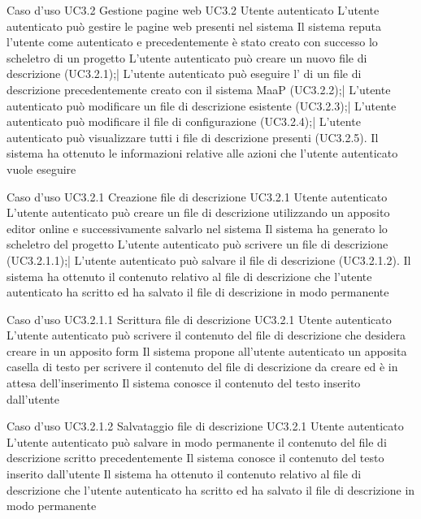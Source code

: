 \UCtitle
{Caso d'uso UC3.2}
{Gestione pagine web}
\UC
{UC3.2}
{Utente autenticato}
{L'utente autenticato può gestire le pagine web presenti nel sistema}
{Il sistema reputa l'utente come autenticato e precedentemente è stato creato con successo lo scheletro di un progetto}
\scenario
{L'utente autenticato può creare un nuovo file di descrizione (UC3.2.1);|
L'utente autenticato può eseguire l' di un file di descrizione precedentemente creato con il sistema MaaP (UC3.2.2);|
L'utente autenticato può modificare un file di descrizione esistente (UC3.2.3);|
L'utente autenticato può modificare il file di configurazione (UC3.2.4);|
L'utente autenticato può visualizzare tutti i file di descrizione presenti (UC3.2.5).
}
\post
{Il sistema ha ottenuto le informazioni relative alle azioni che l'utente autenticato vuole eseguire}


\UCtitle
{Caso d'uso UC3.2.1}
{Creazione file di descrizione}
\UC
{UC3.2.1}
{Utente autenticato}
{L'utente autenticato può creare un file di descrizione utilizzando un apposito editor online e successivamente salvarlo nel sistema}
{Il sistema ha generato lo scheletro del progetto}
\scenario
{L'utente autenticato può scrivere un file di descrizione (UC3.2.1.1);|
L'utente autenticato può salvare il file di descrizione (UC3.2.1.2).
}
\post
{Il sistema ha ottenuto il contenuto relativo al file di descrizione che l'utente autenticato ha scritto ed ha salvato il file di descrizione in modo permanente}

\UCtitle
{Caso d'uso UC3.2.1.1}
{Scrittura file di descrizione}
\UC
{UC3.2.1}
{Utente autenticato}
{L'utente autenticato può scrivere il contenuto del file di descrizione che desidera creare in un apposito form}
{Il sistema propone all'utente autenticato un apposita casella di testo per scrivere il contenuto del file di descrizione da creare ed è in attesa dell'inserimento}
\post
{Il sistema conosce il contenuto del testo inserito dall'utente}

\UCtitle
{Caso d'uso UC3.2.1.2}
{Salvataggio file di descrizione}
\UC
{UC3.2.1}
{Utente autenticato}
{L'utente autenticato può salvare in modo permanente il contenuto del file di descrizione scritto precedentemente}
{Il sistema conosce il contenuto del testo inserito dall'utente}
\post
{Il sistema ha ottenuto il contenuto relativo al file di descrizione che l'utente autenticato ha scritto ed ha salvato il file di descrizione in modo permanente}

